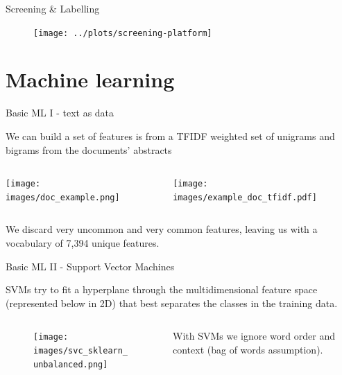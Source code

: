 \documentclass[9pt]{beamer}
\begin{document}
\begin{frame}{Screening \& Labelling}

\begin{figure}
\texttt{[image: ../plots/screening-platform]}
\end{figure}

\end{frame}



\section{Machine learning}

\begin{frame}{Basic ML I - text as data}

We can build a set of features is from a TFIDF weighted set of unigrams and bigrams from the documents' abstracts

\medskip

\begin{columns}
\begin{column}{0.5\linewidth}
\texttt{[image: images/doc\_example.png]}
\end{column}
\begin{column}{0.5\linewidth}
\texttt{[image: images/example\_doc\_tfidf.pdf]}
\end{column}
\end{columns}

\medskip

We discard very uncommon and very common features, leaving us with a vocabulary of 7,394 unique features.

\end{frame}

\begin{frame}{Basic ML II - Support Vector Machines}

SVMs try to fit a hyperplane through the multidimensional feature space (represented below in 2D) that best separates the classes in the training data.

\begin{columns}
\begin{column}{0.618\linewidth}
\begin{figure}
\texttt{[image: images/svc\_sklearn\_unbalanced.png]}
\end{figure}
\end{column}
\begin{column}{0.382\linewidth}
With SVMs we ignore word order and context (bag of words assumption).
\end{column}
\end{columns}

\end{frame}
\end{document}
